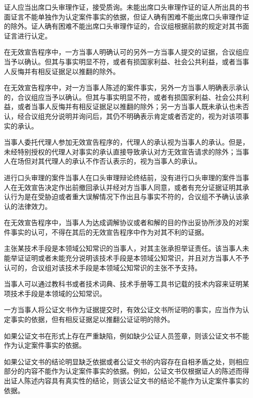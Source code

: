 证人应当出席口头审理作证，接受质询。未能出席口头审理作证的证人所出具的书面证言不能单独作为认定案件事实的依据，但证人确有困难不能出席口头审理作证的除外。证人确有困难不能出席口头审理作证的，合议组根据前款的规定对其书面证言进行认定。

在无效宣告程序中，一方当事人明确认可的另外一方当事人提交的证据，合议组应当予以确认。但其与事实明显不符，或者有损国家利益、社会公共利益，或者当事人反悔并有相反证据足以推翻的除外。

在无效宣告程序中，对一方当事人陈述的案件事实，另外一方当事人明确表示承认的，合议组应当予以确认。但其与事实明显不符，或者有损国家利益、社会公共利益，或者当事人反悔并有相反证据足以推翻的除外；另一方当事人既未承认也未否认，经合议组充分说明并询问后，其仍不明确表示肯定或者否定的，视为对该项事实的承认。

当事人委托代理人参加无效宣告程序的，代理人的承认视为当事人的承认。但是，未经特别授权的代理人对事实的承认直接导致承认对方无效宣告请求的除外；当事人在场但对其代理人的承认不作否认表示的，视为当事人的承认。

进行口头审理的案件当事人在口头审理辩论终结前，没有进行口头审理的案件当事人在无效宣告决定作出前撤回承认并经对方当事人同意，或者有充分证据证明其承认行为是在受胁迫或者重大误解情况下作出且与事实不符的，合议组不予确认该承认的法律效力。

在无效宣告程序中，当事人为达成调解协议或者和解的目的作出妥协所涉及的对案件事实的认可，不得在其后的无效宣告程序中作为对其不利的证据。

主张某技术手段是本领域公知常识的当事人，对其主张承担举证责任。该当事人未能举证证明或者未能充分说明该技术手段是本领域公知常识，并且对方当事人不予认可的，合议组对该技术手段是本领域公知常识的主张不予支持。

当事人可以通过教科书或者技术词典、技术手册等工具书记载的技术内容来证明某项技术手段是本领域的公知常识。

一方当事人将公证文书作为证据提交时，有效公证文书所证明的事实，应当作为认定事实的依据，但有相反证据足以推翻公证证明的除外。

如果公证文书在形式上存在严重缺陷，例如缺少公证人员签章，则该公证文书不能作为认定案件事实的依据。

如果公证文书的结论明显缺乏依据或者公证文书的内容存在自相矛盾之处，则相应部分的内容不能作为认定案件事实的依据。例如，公证文书仅根据证人的陈述而得出证人陈述内容具有真实性的结论，则该公证文书的结论不能作为认定案件事实的依据。

